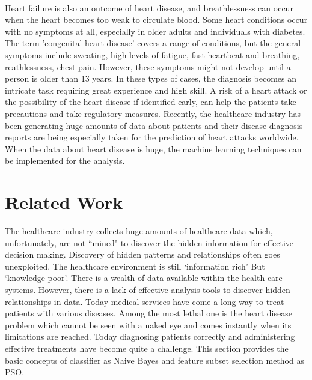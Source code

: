 \documentclass{book}
\begin{document}
    \paragraph{}
    Heart failure is also an outcome of heart disease, and breathlessness can occur when the heart becomes too weak to circulate blood. Some heart conditions occur with no symptoms at all, especially in older adults and individuals with diabetes. The term 'congenital heart disease' covers a range of conditions, but the general symptoms include sweating, high levels of fatigue, fast heartbeat and breathing, reathlessness, chest pain. However, these symptoms might not develop until a person is older than 13 years. In these types of cases, the diagnosis becomes an intricate task requiring great experience and high skill. A risk of a heart attack or the possibility of the heart disease if identified early, can help the patients take  precautions and take regulatory measures. Recently, the healthcare industry has been generating huge amounts of data about patients and their disease diagnosis reports are being especially taken for the prediction of heart attacks worldwide. When the data about heart disease is huge, the machine learning techniques can be implemented for the analysis.
    
    
    \section{Related Work}
    The healthcare industry collects huge amounts of healthcare data which, unfortunately, are not ``mined" to discover the hidden information for effective decision making. Discovery of hidden patterns and relationships often goes unexploited.
    The healthcare environment is still ‘information rich’ But ‘knowledge poor’. There is a wealth of data available within the health care systems. However, there is a lack of effective analysis tools to discover hidden relationships in data.
    Today medical services have come a long way to treat patients with various diseases. Among the most lethal one is the heart disease problem which cannot be seen with a naked eye and comes instantly when its limitations are reached. Today diagnosing patients correctly and administering effective treatments have become quite a challenge. This section provides the basic concepts of classifier as Naive Bayes and feature subset selection method as PSO.
   
\end{document}
